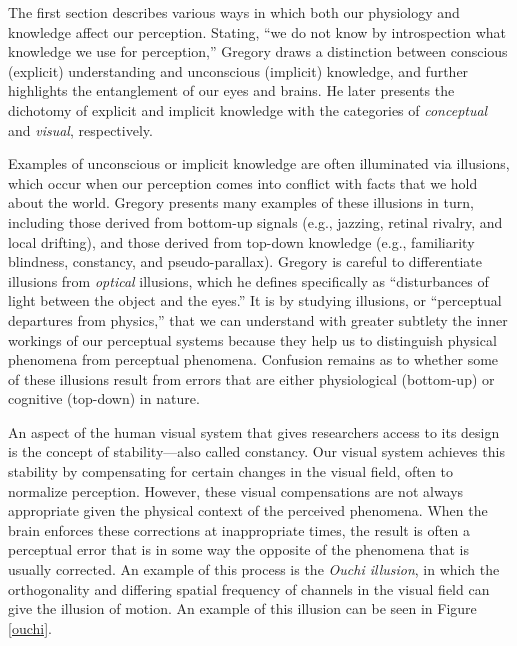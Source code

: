 \documentclass[12pt]{article} %
\begin{document}
The first section describes various ways in which both our physiology and knowledge affect our perception.
Stating, ``we do not know by introspection what knowledge we use for perception,'' Gregory draws a distinction between conscious (explicit) understanding and unconscious (implicit) knowledge, and further highlights the entanglement of our eyes and brains.
He later presents the dichotomy of explicit and implicit knowledge with the categories of \textit{conceptual} and \textit{visual}, respectively.

Examples of unconscious or implicit knowledge are often illuminated via illusions, which occur when our perception comes into conflict with facts that we hold about the world. Gregory presents many examples of these illusions in turn, including those derived from bottom-up signals (e.g., jazzing, retinal rivalry, and local drifting), and those derived from top-down knowledge (e.g., familiarity blindness, constancy, and pseudo-parallax). Gregory is careful to differentiate illusions from \textit{optical} illusions, which he defines specifically as ``disturbances of light between the object and the eyes.'' It is by studying illusions, or ``perceptual departures from physics,'' that we can understand with greater subtlety the inner workings of our perceptual systems because they help us to distinguish physical phenomena from perceptual phenomena. Confusion remains as to whether some of these illusions result from errors that are either physiological (bottom-up) or cognitive (top-down) in nature.  

An aspect of the human visual system that gives researchers access to its design is the concept of stability---also called constancy. Our visual system achieves this stability by compensating for certain changes in the visual field, often to normalize perception. However, these visual compensations are not always appropriate given the physical context of the perceived phenomena. When the brain enforces these corrections at inappropriate times, the result is often a perceptual error that is in some way the opposite of the phenomena that is usually corrected. An example of this process is the \textit{Ouchi illusion}, in which the orthogonality and differing spatial frequency of channels in the visual field can give the illusion of motion. An example of this illusion can be seen in Figure \ref{ouchi}.
\end{document}
